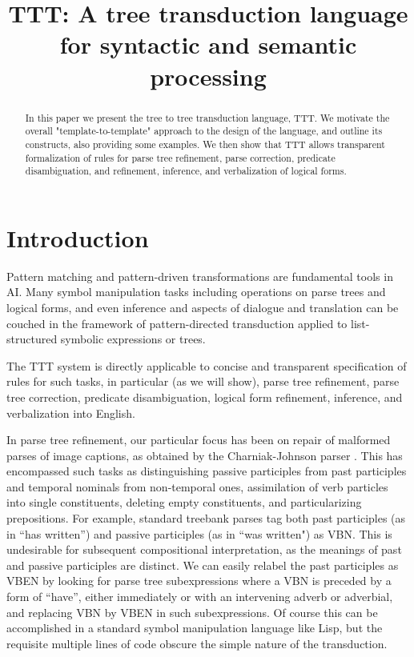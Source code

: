 \documentclass[a4,11pt]{article}
\title{TTT: A tree transduction language for syntactic and semantic processing}
\date{}
\begin{document}
\maketitle
\begin{abstract}
In this paper we present the tree to tree transduction language, TTT. We
motivate the overall "template-to-template" approach to the design of 
the language, and outline its constructs, also providing some examples. 
We then show that TTT allows transparent formalization of rules for
parse tree refinement, parse correction, predicate disambiguation, 
and refinement, inference, and verbalization of logical forms. 

\end{abstract}

\section{Introduction}
Pattern matching and pattern-driven transformations are fundamental tools in AI.  Many symbol manipulation tasks including operations on parse trees and logical forms, and even inference and aspects of dialogue and translation can be couched in the framework of pattern-directed transduction applied to list-structured symbolic expressions or trees.

The TTT system is directly applicable to concise and transparent specification of rules for such tasks, in particular (as we will show), parse tree refinement, parse tree correction, predicate disambiguation, logical form refinement, inference, and verbalization into English. 

In parse tree refinement, our particular focus has been on repair of malformed parses of image captions, as obtained by the Charniak-Johnson parser \cite{Charniak-Johnson:2005}. This has encompassed such tasks as distinguishing passive participles from past participles and temporal nominals from non-temporal ones, assimilation of verb particles into single constituents, deleting empty constituents, and particularizing prepositions. For example, standard treebank parses tag both past participles (as in ``has written'') and passive participles (as in ``was written") as VBN. This is undesirable for subsequent compositional interpretation, as the meanings of past and passive participles are distinct. We can easily relabel the past participles as VBEN by looking for parse tree subexpressions where a VBN is preceded by a form of ``have'', either immediately or with an intervening adverb or adverbial, and replacing VBN by VBEN in such subexpressions. Of course this can be accomplished in a standard symbol manipulation language like Lisp, but the requisite multiple lines of code obscure the simple nature of the transduction.
\end{document}
